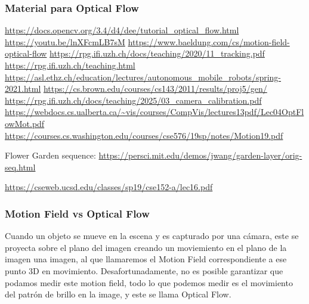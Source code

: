   \begin{frame}
  \frametitle{Material para Optical Flow}
  
  \url{https://docs.opencv.org/3.4/d4/dee/tutorial_optical_flow.html}
  \url{https://youtu.be/lnXFcmLB7sM}
  \url{https://www.baeldung.com/cs/motion-field-optical-flow}
  \url{https://rpg.ifi.uzh.ch/docs/teaching/2020/11_tracking.pdf}
  \url{https://rpg.ifi.uzh.ch/teaching.html}
  \url{https://asl.ethz.ch/education/lectures/autonomous_mobile_robots/spring-2021.html}
  \url{https://cs.brown.edu/courses/cs143/2011/results/proj5/gen/}
  \url{https://rpg.ifi.uzh.ch/docs/teaching/2025/03_camera_calibration.pdf}
  \url{https://webdocs.cs.ualberta.ca/~vis/courses/CompVis/lectures13pdf/Lec04OptFlowMot.pdf}
  \url{https://courses.cs.washington.edu/courses/cse576/19sp/notes/Motion19.pdf}

  Flower Garden sequence: \url{https://persci.mit.edu/demos/jwang/garden-layer/orig-seq.html}

  \url{https://cseweb.ucsd.edu/classes/sp19/cse152-a/lec16.pdf}

\end{frame}

\begin{frame}
  \frametitle{Motion Field vs Optical Flow}
  Cuando un objeto se mueve en la escena y es capturado por una cámara, este se proyecta sobre el plano del imagen creando un moviemiento en el plano de la imagen una imagen, al que llamaremos el Motion Field correspondiente a ese punto 3D en movimiento. Desafortunadamente, no es posible garantizar que podamos medir este motion field, todo lo que podemos medir es el movimiento del patrón de brillo en la image, y este se llama Optical Flow.

\end{frame}

